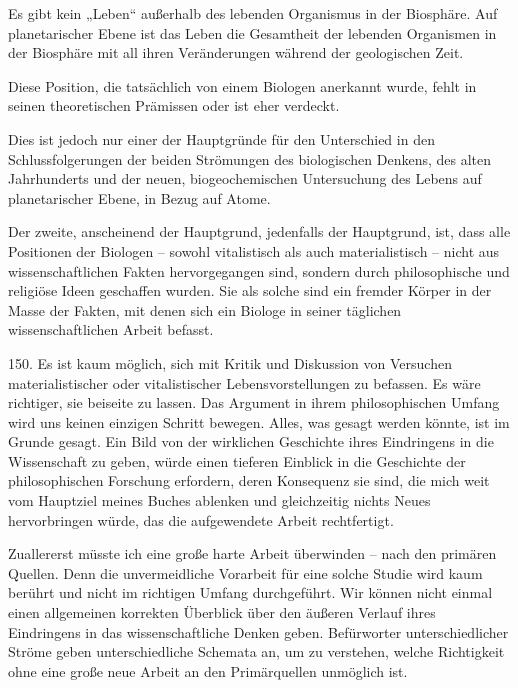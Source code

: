 \documentclass[11pt,a4paper]{book}
\begin{document}
Es gibt kein „Leben“ außerhalb des lebenden Organismus in der Biosphäre. Auf planetarischer Ebene ist das Leben die Gesamtheit der lebenden Organismen in der Biosphäre mit all ihren Veränderungen während der geologischen Zeit.



Diese Position, die tatsächlich von einem Biologen anerkannt wurde, fehlt in seinen theoretischen Prämissen oder ist eher verdeckt.



Dies ist jedoch nur einer der Hauptgründe für den Unterschied in den Schlussfolgerungen der beiden Strömungen des biologischen Denkens, des alten Jahrhunderts und der neuen, biogeochemischen Untersuchung des Lebens auf planetarischer Ebene, in Bezug auf Atome.



Der zweite, anscheinend der Hauptgrund, jedenfalls der Hauptgrund, ist, dass alle Positionen der Biologen -- sowohl vitalistisch als auch materialistisch -- nicht aus wissenschaftlichen Fakten hervorgegangen sind, sondern durch philosophische und religiöse Ideen geschaffen wurden. Sie als solche sind ein fremder Körper in der Masse der Fakten, mit denen sich ein Biologe in seiner täglichen wissenschaftlichen Arbeit befasst.



150. Es ist kaum möglich, sich mit Kritik und Diskussion von Versuchen materialistischer oder vitalistischer Lebensvorstellungen zu befassen. Es wäre richtiger, sie beiseite zu lassen. Das Argument in ihrem philosophischen Umfang wird uns keinen einzigen Schritt bewegen. Alles, was gesagt werden könnte, ist im Grunde gesagt. Ein Bild von der wirklichen Geschichte ihres Eindringens in die Wissenschaft zu geben, würde einen tieferen Einblick in die Geschichte der philosophischen Forschung erfordern, deren Konsequenz sie sind, die mich weit vom Hauptziel meines Buches ablenken und gleichzeitig nichts Neues hervorbringen würde, das die aufgewendete Arbeit rechtfertigt.



Zuallererst müsste ich eine große harte Arbeit überwinden -- nach den primären Quellen. Denn die unvermeidliche Vorarbeit für eine solche Studie wird kaum berührt und nicht im richtigen Umfang durchgeführt. Wir können nicht einmal einen allgemeinen korrekten Überblick über den äußeren Verlauf ihres Eindringens in das wissenschaftliche Denken geben. Befürworter unterschiedlicher Ströme geben unterschiedliche Schemata an, um zu verstehen, welche Richtigkeit ohne eine große neue Arbeit an den Primärquellen unmöglich ist.
\end{document}
